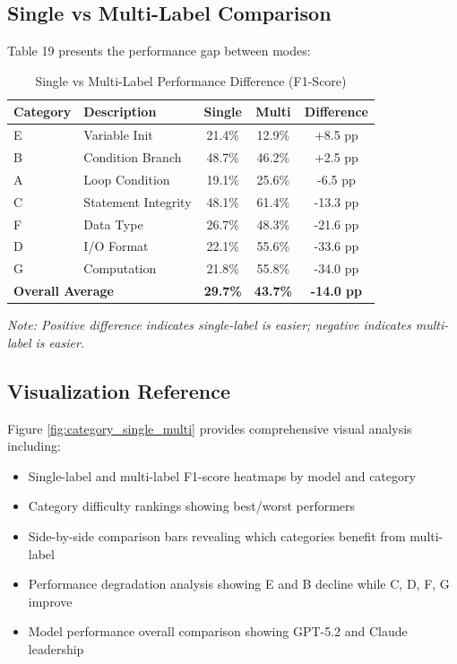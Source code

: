 \documentclass[12pt,a4paper]{article}
\begin{document}
\subsection{Single vs Multi-Label Comparison}

Table 19 presents the performance gap between modes:

\begin{table}[H]
\centering
\label{tab:single_vs_multi_diff}
\begin{tabular}{llccc}
\toprule
\textbf{Category} & \textbf{Description} & \textbf{Single} & \textbf{Multi} & \textbf{Difference} \\
\midrule
E & Variable Init & 21.4\% & 12.9\% & +8.5 pp \\
B & Condition Branch & 48.7\% & 46.2\% & +2.5 pp \\
A & Loop Condition & 19.1\% & 25.6\% & -6.5 pp \\
C & Statement Integrity & 48.1\% & 61.4\% & -13.3 pp \\
F & Data Type & 26.7\% & 48.3\% & -21.6 pp \\
D & I/O Format & 22.1\% & 55.6\% & -33.6 pp \\
G & Computation & 21.8\% & 55.8\% & -34.0 pp \\
\midrule
\multicolumn{2}{l}{\textbf{Overall Average}} & \textbf{29.7\%} & \textbf{43.7\%} & \textbf{-14.0 pp} \\
\bottomrule
\end{tabular}
\caption{Single vs Multi-Label Performance Difference (F1-Score)}
\end{table}

\textit{Note: Positive difference indicates single-label is easier; negative indicates multi-label is easier.}

\subsection{Visualization Reference}

Figure \ref{fig:category_single_multi} provides comprehensive visual analysis including:
\begin{itemize}[leftmargin=*]
    \item Single-label and multi-label F1-score heatmaps by model and category
    \item Category difficulty rankings showing best/worst performers
    \item Side-by-side comparison bars revealing which categories benefit from multi-label
    \item Performance degradation analysis showing E and B decline while C, D, F, G improve
    \item Model performance overall comparison showing GPT-5.2 and Claude leadership
\end{itemize}
\end{document}
